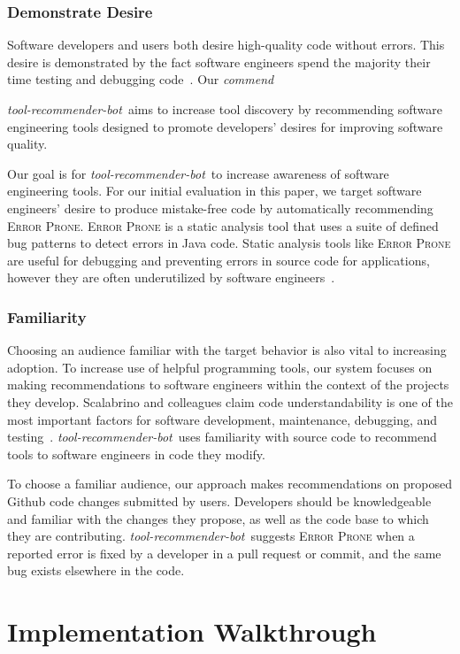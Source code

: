 \documentclass[sigconf,review,anonymous]{acmart}
\newcommand{\tool}{\textsl{tool-recommender-bot}}
\begin{document}
\subsubsection{Demonstrate Desire}

Software developers and users both desire high-quality code without errors. This desire is demonstrated by the fact software engineers spend the majority their time testing and debugging code~\cite{NIST}. Our \textit{commend}

\tool~aims to increase tool discovery by recommending software engineering tools designed to promote developers' desires for improving software quality.

Our goal is for \tool~to increase awareness of software engineering tools. For our initial evaluation in this paper, we target software engineers' desire to produce mistake-free code by automatically recommending \textsc{Error Prone}. \textsc{Error Prone} is a static analysis tool that uses a suite of defined bug patterns to detect errors in Java code. Static analysis tools like \textsc{Error Prone} are useful for debugging and preventing errors in source code for applications, however they are often underutilized by software engineers~\cite{Johnson2013Why}. 

\subsubsection{Familiarity}

Choosing an audience familiar with the target behavior is also vital to increasing adoption. To increase use of helpful programming tools, our system focuses on making recommendations to software engineers within the context of the projects they develop. Scalabrino and colleagues claim code understandability is one of the most important factors for software development, maintenance, debugging, and testing~\cite{Scalabrino2017Understandability}. \tool~uses familiarity with source code to recommend tools to software engineers in code they modify.

To choose a familiar audience, our approach makes recommendations on proposed Github code changes submitted by users. Developers should be knowledgeable and familiar with the changes they propose, as well as the code base to which they are contributing. \tool~suggests \textsc{Error Prone} when a reported error is fixed by a developer in a pull request or commit, and the same bug exists elsewhere in the code. 


\section{Implementation Walkthrough}
\end{document}
